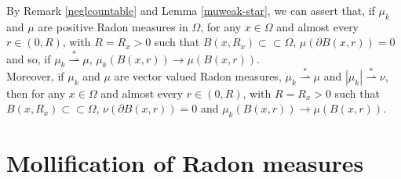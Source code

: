 \begin{remark} By Remark \ref{neglcountable} and Lemma \ref{muweak-star}, we can assert that, if $\mu_{k}$ and $\mu$ are positive Radon measures in $\Omega$, for any $x \in \Omega$ and almost every $r \in (0, R)$, with $R = R_{x} > 0$ such that $B(x, R_{x}) \subset \subset \Omega$, $\mu(\partial B(x,r)) = 0$ and so, if $\mu_{k} \stackrel {*} {\rightharpoonup} \mu$, $\mu_{k}(B(x,r)) \to \mu(B(x,r))$. 
\\
Moreover, if $\mu_{k}$ and $\mu$ are vector valued Radon measures, $\mu_{k} \stackrel {*}{\rightharpoonup} \mu$ and $|\mu_{k}| \stackrel {*} {\rightharpoonup} \nu$, then for any $x \in \Omega$ and almost every $r \in (0, R)$, with $R = R_{x} > 0$ such that $B(x, R_{x}) \subset \subset \Omega$, $\nu(\partial B(x,r)) = 0$ and $\mu_{k}(B(x,r)) \to \mu(B(x,r))$.
\end{remark}


\section{Mollification of Radon measures}


